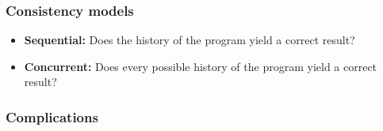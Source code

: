 \documentclass{beamer}
\begin{document}
  \begin{frame}
    \frametitle{Consistency models}

    \begin{itemize}
      \item \textbf{Sequential:} Does the history of the program yield a correct result?
      \item \textbf{Concurrent:} Does every possible history of the program yield a correct result?
    \end{itemize}
  \end{frame}

  \begin{frame}
    \frametitle{Complications}


  \end{frame}
\end{document}
